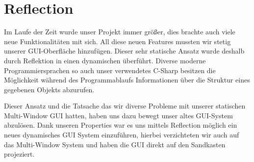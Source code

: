 \section{Reflection}
Im Laufe der Zeit wurde unser Projekt immer größer, dies brachte auch viele neue Funktionalitäten mit sich.
All diese neuen Features mussten wir stetig unserer GUI-Oberfläche hinzufügen. Dieser sehr statische Ansatz wurde deshalb durch Reflektion in einen dynamischen überführt.
Diverse moderne Programmiersprachen so auch unser verwendetes C-Sharp besitzen die Möglichkeit während des Programmablaufs Informationen über die Struktur eines gegebenen Objekts abzurufen.



Dieser Ansatz und die Tatsache das wir diverse Probleme mit unserer statischen Multi-Window GUI hatten, haben uns dazu bewegt unser altes GUI-System abzulösen.
Dank unseren Properties war es uns mittels Reflection möglich ein neues dynamisches GUI System einzuführen, hierbei verzichteten wir auch auf das Multi-Window System und haben die GUI direkt auf den Sandkasten projeziert.


\clearpage

